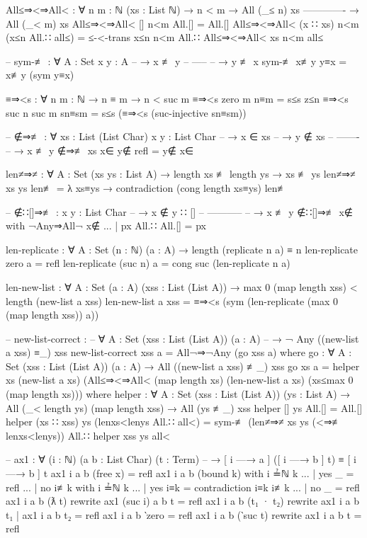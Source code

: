 \documentclass[logo,bsc,singlespacing,parskip,online]{infthesis}
\renewenvironment{code}{\mintedcopy[breaklines,breaksymbolleft=\;]{agda}}{\endmintedcopy}
\begin{document}
\begin{code}
All≤⇒<⇒All< : ∀ {n m : ℕ} (xs : List ℕ)
  → n < m
  → All (_≤ n) xs
    -------------
  → All (_< m) xs
All≤⇒<⇒All< [] n<m All.[] = All.[]
All≤⇒<⇒All< (x ∷ xs) n<m (x≤n All.∷ all≤) =
  ≤-<-trans x≤n n<m All.∷ All≤⇒<⇒All< xs n<m all≤

-- sym-≢ : ∀ {A : Set} {x y : A}
--   → x ≢ y
--     -----
--   → y ≢ x
sym-≢ x≢y y≡x = x≢y (sym y≡x)

≡⇒<s : ∀ {n m : ℕ} → n ≡ m → n < suc m
≡⇒<s {zero} {m} n≡m = s≤s z≤n
≡⇒<s {suc n} {suc m} sn≡sm = s≤s (≡⇒<s (suc-injective sn≡sm))

-- ∉⇒≢ : ∀ {xs : List (List Char)} {x y : List Char}
--   → x ∈ xs
--   → y ∉ xs
--     -------
--   → x ≢ y
∉⇒≢ {xs} x∈ y∉ refl = y∉ x∈

len≠⇒≠ : ∀ {A : Set} (xs ys : List A)
  → length xs ≢ length ys → xs ≢ ys
len≠⇒≠ xs ys len≢ =
  λ xs≡ys → contradiction (cong length xs≡ys) len≢

-- ∉∷[]⇒≢ : {x y : List Char}
--   → x ∉ y ∷ []
--     -----------
--   → x ≢ y
∉∷[]⇒≢ x∉ with ¬Any⇒All¬ x∉
... | px All.∷ All.[] = px

len-replicate : ∀ {A : Set} (n : ℕ) (a : A)
  → length (replicate n a) ≡ n
len-replicate zero a = refl
len-replicate (suc n) a = cong suc (len-replicate n a)

len-new-list : ∀ {A : Set} (a : A) (xss : List (List A))
  → max 0 (map length xss) < length (new-list a xss)
len-new-list a xss =
  ≡⇒<s (sym (len-replicate (max 0 (map length xss)) a))

-- new-list-correct :
--   ∀ {A : Set} (xss : List (List A)) (a : A)
--   → ¬ Any ((new-list a xss) ≡_) xss
new-list-correct xss a = All¬⇒¬Any (go xss a)
  where
    go : ∀ {A : Set} (xss : List (List A)) (a : A)
      → All ((new-list a xss) ≢_) xss
    go xs a =
      helper
        xs
        (new-list a xs)
        (All≤⇒<⇒All<
          (map length xs)
          (len-new-list a xs)
          (xs≤max 0 (map length xs)))
      where
        helper : ∀ {A : Set} (xss : List (List A)) (ys : List A)
          → All (_< length ys) (map length xss)
          → All (ys ≢_) xss
        helper [] ys All.[] = All.[]
        helper (xs ∷ xss) ys (lenxs<lenys All.∷ all<) =
          sym-≢ (len≠⇒≠ xs ys (<⇒≢ lenxs<lenys))
            All.∷ helper xss ys all<

-- ax1 : ∀ (i : ℕ) (a b : List Char) (t : Term)
--   → [ i —→ a ] ([ i —→ b ] t) ≡ [ i —→ b ] t
ax1 i a b (free x) = refl
ax1 i a b (bound k) with i ≟ℕ k
... | yes _   = refl
... | no  i≢k with i ≟ℕ k
...   | yes i≡k = contradiction i≡k i≢k
...   | no  _   = refl
ax1 i a b (ƛ t) rewrite ax1 (suc i) a b t = refl
ax1 i a b (t₁ · t₂) rewrite ax1 i a b t₁ | ax1 i a b t₂ = refl
ax1 i a b ‵zero = refl
ax1 i a b (‵suc t) rewrite ax1 i a b t = refl


\end{code}
\end{document}
